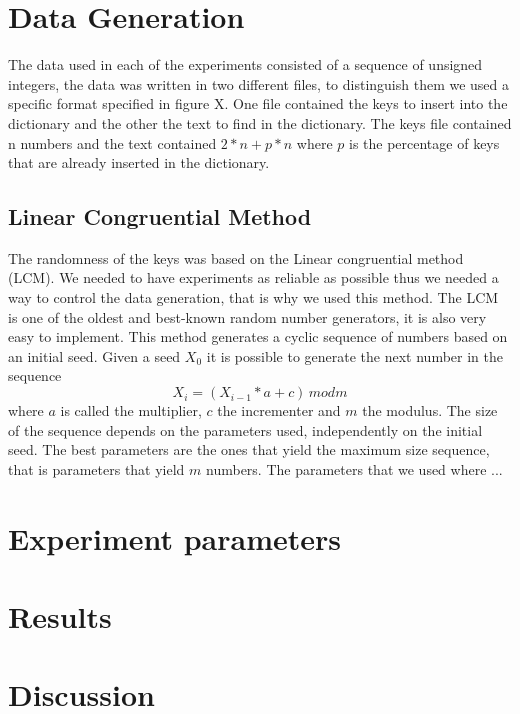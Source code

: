 \documentclass{article}
\begin{document}
    \section{Data Generation}
        The data used in each of the experiments consisted of a sequence of unsigned integers,  
        the data was written in two different files, to distinguish them we used a specific 
        format specified in figure X. One file contained the keys to insert into the dictionary and the other the text to find in the dictionary. 
        The keys file contained n numbers and the text contained $2 * n + p * n$ where $p$ is the percentage of keys that are already inserted in the dictionary.
		\subsection*{Linear Congruential Method}
		The randomness of the keys was based on the Linear congruential method (LCM). 
		We needed to have experiments as reliable as possible thus we needed a way to control the data generation, 
		that is why we used this method. The LCM is one of the oldest and best-known random number generators, 
		it is also very easy to implement. This method generates a cyclic sequence of numbers based on an initial seed. 
		Given a seed $X_0$ it is possible to generate the next number in the sequence 
		\begin{equation}
		X_i = (X_{i-1} * a + c) \, mod m
		\end{equation}
		 where $a$ is called the multiplier, $c$ the incrementer and $m$ the modulus. 
		 The size of the sequence depends on the parameters used, independently on the initial seed.
		  The best parameters are the ones that yield the maximum size sequence, that is parameters that yield $m$ numbers.  
		  The parameters that we used where ...
    \section{Experiment parameters}

    \section{Results}

    \section{Discussion}



    \printbibliography
\end{document}
